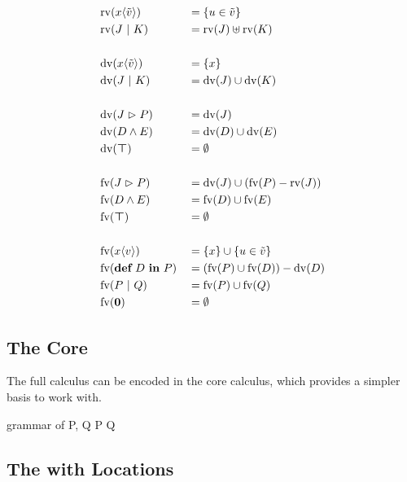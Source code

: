 \begin{alignat*}{2}
  & \operatorname{rv}(x\langle\tilde{v}\rangle) & &= \{ u \in \tilde{v} \} \\
  & \operatorname{rv}(J \ |\  K)           & &= \operatorname{rv}(J) \uplus \operatorname{rv}(K) \\
  \\
  & \operatorname{dv}(x\langle\tilde{v}\rangle) & &= \{ x \} \\
  & \operatorname{dv}(J \ |\  K)           & &= \operatorname{dv}(J) \cup \operatorname{dv}(K) \\
  \\
  & \operatorname{dv}(J \vartriangleright P)         & &= \operatorname{dv}(J) \\
  & \operatorname{dv}(D \wedge E)           & &= \operatorname{dv}(D) \cup \operatorname{dv}(E) \\
  & \operatorname{dv}(\boldsymbol{\top})           & &= \emptyset \\
  \\
  & \operatorname{fv}(J \vartriangleright P)         & &= \operatorname{dv}(J) \cup (\operatorname{fv}(P) - \operatorname{rv}(J)) \\
  & \operatorname{fv}(D \wedge E)           & &= \operatorname{fv}(D) \cup \operatorname{fv}(E) \\
  & \operatorname{fv}(\boldsymbol{\top})           & &= \emptyset \\
  \\
  & \operatorname{fv}(x\langle v\rangle)         & &= \{ x \} \cup \{ u \in \tilde{v} \} \\
  & \operatorname{fv}(\textbf{def} \ D \ \textbf{in} \ P)         & &= (\operatorname{fv}(P) \cup \operatorname{fv}(D)) - \operatorname{dv}(D) \\
  & \operatorname{fv}(P \ |\  Q)           & &= \operatorname{fv}(P) \cup \operatorname{fv}(Q) \\
  & \operatorname{fv}(\textbf{0})          & &= \emptyset \\
\end{alignat*}



\subsection{The Core \JoinCalc}

The full calculus can be encoded in the core calculus,
which provides a simpler basis to work with.

\begin{JDef}{grammar of \monadicjoincalc}
  P, Q
  \grmr {}
  \altn P \jpar Q
  \altn {}
\end{JDef}


\subsection{The \JoinCalc with Locations}

